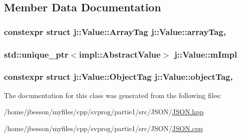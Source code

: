 \subsection{Member Data Documentation}
\hypertarget{classj_1_1_value_a222ab93e1ee2faeb71d53d98cf3fda2a}{
\subsubsection[{array\-Tag}]{\setlength{\rightskip}{0pt plus 5cm}constexpr struct {\bf j\-::\-Value\-::\-Array\-Tag}  j\-::\-Value\-::array\-Tag\hspace{0.3cm}{\ttfamily [static]}, {\ttfamily [protected]}}}\label{classj_1_1_value_a222ab93e1ee2faeb71d53d98cf3fda2a}
\hypertarget{classj_1_1_value_a07b659b8454529ba651033e32a203540}{
\subsubsection[{m\-Impl}]{\setlength{\rightskip}{0pt plus 5cm}std\-::unique\-\_\-ptr$<${\bf impl\-::\-Abstract\-Value}$>$ j\-::\-Value\-::m\-Impl\hspace{0.3cm}{\ttfamily [private]}}}\label{classj_1_1_value_a07b659b8454529ba651033e32a203540}
\hypertarget{classj_1_1_value_adb703d34b8b58a1a301183d092b86a16}{
\subsubsection[{object\-Tag}]{\setlength{\rightskip}{0pt plus 5cm}constexpr struct {\bf j\-::\-Value\-::\-Object\-Tag}  j\-::\-Value\-::object\-Tag\hspace{0.3cm}{\ttfamily [static]}, {\ttfamily [protected]}}}\label{classj_1_1_value_adb703d34b8b58a1a301183d092b86a16}


The documentation for this class was generated from the following files\-:\begin{DoxyCompactItemize}
\item 
/home/jbesson/myfiles/cpp/svprog/partie1/src/\-J\-S\-O\-N/\hyperlink{_j_s_o_n_8hpp}{J\-S\-O\-N.\-hpp}\item 
/home/jbesson/myfiles/cpp/svprog/partie1/src/\-J\-S\-O\-N/\hyperlink{_j_s_o_n_8cpp}{J\-S\-O\-N.\-cpp}\end{DoxyCompactItemize}
